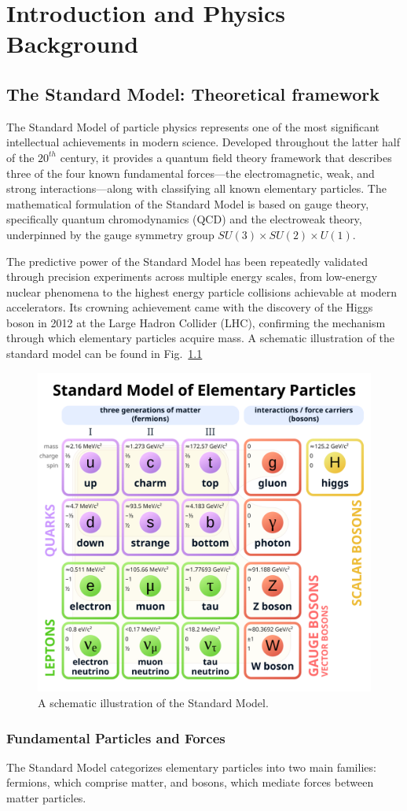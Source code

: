 \chapter{Introduction and Physics Background}
\section{The Standard Model: Theoretical framework}
The Standard Model of particle physics represents one of the most significant intellectual achievements in modern science.
%
Developed throughout the latter half of the $20^{th}$ century, it provides a quantum field theory framework that describes three of the four known fundamental forces—the electromagnetic, weak, and strong interactions---along with classifying all known elementary particles.
%
The mathematical formulation of the Standard Model is based on gauge theory, specifically quantum chromodynamics (QCD) and the electroweak theory, underpinned by the gauge symmetry group \(SU(3)\times SU(2)\times U(1)\).

The predictive power of the Standard Model has been repeatedly validated through precision experiments across multiple energy scales, from low-energy nuclear phenomena to the highest energy particle collisions achievable at modern accelerators.
%
Its crowning achievement came with the discovery of the Higgs boson in 2012 at the Large Hadron Collider (LHC), confirming the mechanism through which elementary particles acquire mass.
%
A schematic illustration of the standard model can be found in Fig.~\ref{fig:sm}

\begin{figure}
    \centering
    \includegraphics[width=0.5\linewidth]{figures/Standard_Model_of_Elementary_Particles.svg.png}
    \caption{A schematic illustration of the Standard Model.}
    \label{fig:sm}
\end{figure}
\subsection{Fundamental Particles and Forces}
The Standard Model categorizes elementary particles into two main families: fermions, which comprise matter, and bosons, which mediate forces between matter particles.
